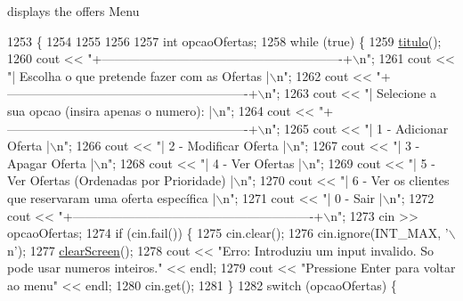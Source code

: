 displays the offers Menu 


\begin{DoxyCode}
1253                           \{
1254 
1255 
1256 
1257     \textcolor{keywordtype}{int} opcaoOfertas;
1258     \textcolor{keywordflow}{while} (\textcolor{keyword}{true}) \{
1259         \hyperlink{classEmpresa_ad79f7196a8ce7256771cbd7b9542155c}{titulo}();
1260         cout << \textcolor{stringliteral}{"+----------------------------------------------------------+\(\backslash\)n"};
1261         cout << \textcolor{stringliteral}{"| Escolha o que pretende fazer com as Ofertas              |\(\backslash\)n"};
1262         cout << \textcolor{stringliteral}{"+----------------------------------------------------------+\(\backslash\)n"};
1263         cout << \textcolor{stringliteral}{"| Selecione a sua opcao (insira apenas o numero):          |\(\backslash\)n"};
1264         cout << \textcolor{stringliteral}{"+----------------------------------------------------------+\(\backslash\)n"};
1265         cout << \textcolor{stringliteral}{"| 1 - Adicionar Oferta                                     |\(\backslash\)n"};
1266         cout << \textcolor{stringliteral}{"| 2 - Modificar Oferta                                     |\(\backslash\)n"};
1267         cout << \textcolor{stringliteral}{"| 3 - Apagar Oferta                                        |\(\backslash\)n"};
1268         cout << \textcolor{stringliteral}{"| 4 - Ver Ofertas                                          |\(\backslash\)n"};
1269         cout << \textcolor{stringliteral}{"| 5 - Ver Ofertas (Ordenadas por Prioridade)               |\(\backslash\)n"};
1270         cout << \textcolor{stringliteral}{"| 6 - Ver os clientes que reservaram uma oferta específica |\(\backslash\)n"};
1271         cout << \textcolor{stringliteral}{"| 0 - Sair                                                 |\(\backslash\)n"};
1272         cout << \textcolor{stringliteral}{"+----------------------------------------------------------+\(\backslash\)n"};
1273         cin >> opcaoOfertas;
1274         \textcolor{keywordflow}{if} (cin.fail()) \{
1275             cin.clear();
1276             cin.ignore(INT\_MAX, \textcolor{charliteral}{'\(\backslash\)n'});
1277             \hyperlink{menu_8h_aceb70c1ed7e11f0863a868704f02214b}{clearScreen}();
1278             cout << \textcolor{stringliteral}{"Erro: Introduziu um input invalido. So pode usar numeros inteiros."} << endl;
1279             cout << \textcolor{stringliteral}{"Pressione Enter para voltar ao menu"} << endl;
1280             cin.get();
1281         \}
1282         \textcolor{keywordflow}{switch} (opcaoOfertas) \{

\end{DoxyCode}
